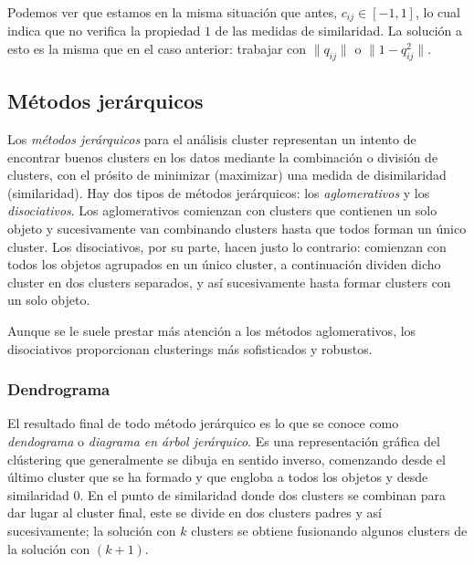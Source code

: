 \begin{observacion}
    Podemos ver que estamos en la misma situación que antes, $c_{ij} \in [-1,1]$, lo cual indica que no verifica la propiedad $1$ de las medidas de similaridad. La solución a esto es 
    la misma que en el caso anterior: trabajar con $\|q_{ij}\|$ o $\|1-q_{ij}^{2}\|$. \newline
\end{observacion}


\subsection{Métodos jerárquicos}  %

Los \textit{métodos jerárquicos} para el análisis cluster representan un intento de encontrar buenos clusters en los datos mediante la combinación o división de clusters, con el prósito de
minimizar (maximizar) una medida de disimilaridad (similaridad). Hay dos tipos de métodos jerárquicos: los \textit{aglomerativos} y los \textit{disociativos}. Los aglomerativos comienzan 
con clusters que contienen un solo objeto y sucesivamente van combinando clusters hasta que todos forman un único cluster. Los disociativos, por su parte, hacen justo lo contrario: 
comienzan con todos los objetos agrupados en un único cluster, a continuación dividen dicho cluster en dos clusters separados, y así sucesivamente hasta formar clusters con un solo objeto. 

\begin{observacion}
Aunque se le suele prestar más atención a los métodos aglomerativos, los disociativos proporcionan clusterings más sofisticados y robustos.
\end{observacion}

\subsubsection{Dendrograma}

El resultado final de todo método jerárquico es lo que se conoce como \textit{dendograma} o \textit{diagrama en árbol jerárquico}. Es una representación gráfica del clústering que generalmente se
dibuja en sentido inverso, comenzando desde el último cluster que se ha formado y que engloba a todos los objetos y desde similaridad 0. En el punto de similaridad donde dos clusters se combinan 
para dar lugar al cluster final, este se divide en dos clusters padres y así sucesivamente; la solución con $k$ clusters se obtiene fusionando algunos clusters de la solución con $(k+1)$. \newline

